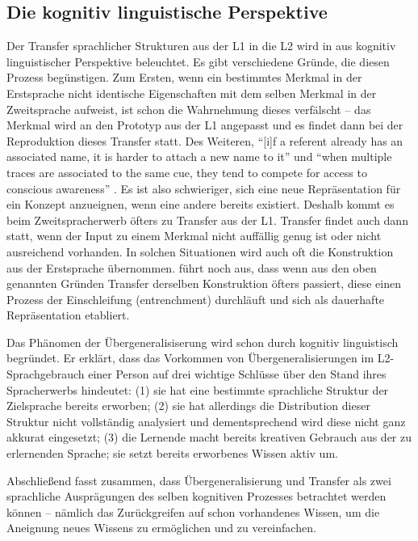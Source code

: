 \subsection{Die kognitiv linguistische Perspektive}
Der Transfer sprachlicher Strukturen aus der L1 in die L2 wird in \cite{Ellis06} aus kognitiv linguistischer Perspektive beleuchtet.
Es gibt verschiedene Gründe, die diesen Prozess begünstigen.
Zum Ersten, wenn ein bestimmtes Merkmal in der Erstsprache nicht identische Eigenschaften mit dem selben Merkmal in der Zweitsprache aufweist, ist schon die Wahrnehmung dieses verfälscht --
das Merkmal wird an den Prototyp aus der L1 angepasst und es findet dann bei der Reproduktion dieses Transfer statt.
Des Weiteren, ``[i]f a referent already has an associated name, it is harder to attach a new name to it'' und
``when multiple traces are associated to the same cue, they tend to compete for access to conscious awareness'' \cite{Ellis06}.
Es ist also schwieriger, sich eine neue Repräsentation für ein Konzept anzueignen, wenn eine andere bereits existiert.
Deshalb kommt es beim Zweitspracherwerb öfters zu Transfer aus der L1.
Transfer findet auch dann statt, wenn der Input zu einem Merkmal nicht auffällig genug ist oder nicht ausreichend vorhanden.
In solchen Situationen wird auch oft die Konstruktion aus der Erstsprache übernommen.
\cite{Ellis06} führt noch aus, dass wenn aus den oben genannten Gründen Transfer derselben Konstruktion öfters passiert, diese einen Prozess der Einschleifung (entrenchment) durchläuft und sich als dauerhafte Repräsentation etabliert.

Das Phänomen der Übergeneralisiserung wird schon durch \cite{Taylor75} kognitiv linguistisch begründet.
Er erklärt, dass das Vorkommen von Übergeneralisierungen im L2-Sprachgebrauch einer Person auf drei wichtige Schlüsse über den Stand ihres Spracherwerbs hindeutet:
(1) sie hat eine bestimmte sprachliche Struktur der Zielsprache bereits erworben;
(2) sie hat allerdings die Distribution dieser Struktur nicht vollständig analysiert und dementsprechend wird diese nicht ganz akkurat eingesetzt;
(3) die Lernende macht bereits kreativen Gebrauch aus der zu erlernenden Sprache; sie setzt bereits erworbenes Wissen aktiv um.

Abschließend fasst \cite{Taylor75} zusammen, dass Übergeneralisierung und Transfer als zwei sprachliche Ausprägungen des selben kognitiven Prozesses betrachtet werden können --
nämlich das Zurückgreifen auf schon vorhandenes Wissen, um die Aneignung neues Wissens zu ermöglichen und zu vereinfachen.



